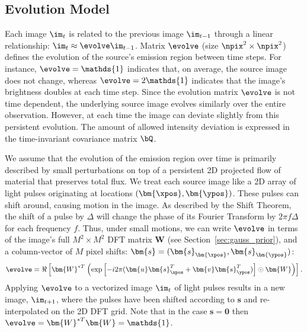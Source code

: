 \vspace{-.2in}
\subsection{Evolution Model}
\label{sec:evolution}

Each image $\im_t$ is related to the previous image $\im_{t-1}$ through a linear relationship: $\im_t \approx \evolve \im_{t-1}$.  Matrix $\evolve$ (size $\npix^2 \times \npix^2$) %
defines the evolution of the source's emission region between time steps.
 For instance, $\evolve=\mathds{1}$ indicates that, on average, the source image does not change, whereas $\evolve=2 \mathds{1}$ indicates that the image's brightness doubles at each time step. Since the evolution matrix $\evolve$ is not time dependent, the underlying source image evolves similarly over the entire observation. However, at each time the image can deviate slightly from this persistent evolution. 
 The amount of allowed intensity deviation is expressed in the time-invariant covariance matrix $\bQ$.  

We assume that the evolution of the emission region over time is primarily described by small perturbations on top of a persistent 2D projected flow of material that preserves total flux.
We treat each source image like a 2D array of light pulses originating at locations $( \bm{\xpos}, \bm{\ypos})$. These pulses can shift around, causing motion in the image. %
As described by the Shift Theorem, the shift of a pulse by $\Delta$ will change the phase of its Fourier Transform by $2 \pi f \Delta$ for each frequency $f$. %
Thus, under small motions, we can write $\evolve$ in terms of the image's full $M^2 \times M^2$ DFT matrix $\bm{W}$ (see Section~\ref{sec:gauss_prior}), and a column-vector of $M$ pixel shifts: $\bm{s} = (\bm{s}_{ \bm{\xpos}}, \bm{s}_{\bm{\ypos}})$:
\begin{align}
\evolve = \Re \left[ \bm{W}^{*T} \hspace{0.01in}  \left(  \exp \left[ -i 2 \pi ( \bm{u} \bm{s}_{\xpos}^T + \bm{v} \bm{s}_{\ypos}^T ) \right]  \odot  \bm{W}  \right) \right] . 
\end{align}
Applying $\evolve$ to a vectorized image $\im_t$ of light pulses results in a new image, $\im_{t+1}$, where the pulses have been shifted according to $\bm{s}$ and re-interpolated on the 2D DFT grid. Note that in the case $\bm{s} = \bm{0}$ then $\evolve = \bm{W}^{*T} \bm{W} = \mathds{1}$.

